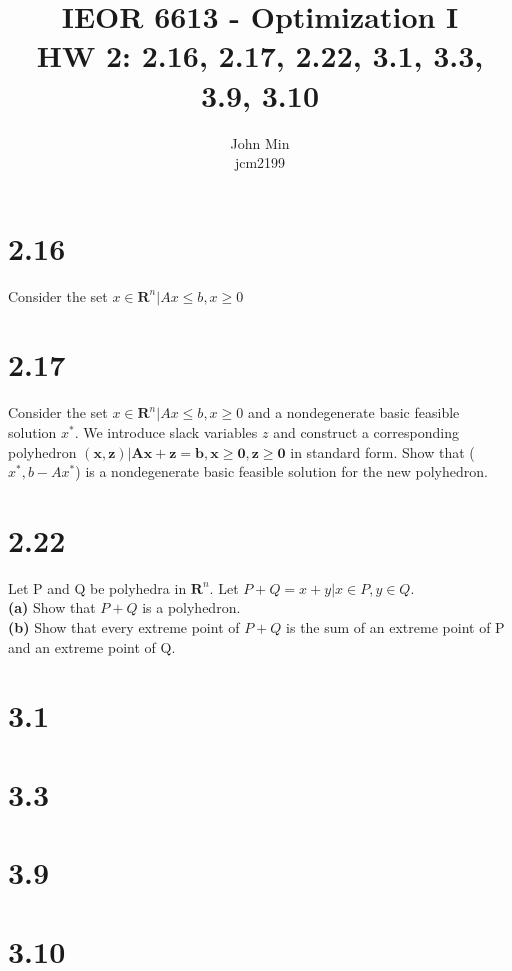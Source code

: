 \documentclass{article}
\begin{document}
\title{IEOR 6613 - Optimization I\\ HW 2:  2.16, 2.17, 2.22, 3.1, 3.3, 3.9, 3.10}

\author{John Min\\ jcm2199}
\maketitle

\section{2.16}
Consider the set {$x \in \mathbf{R}^n | Ax \leq b, x \geq 0$} 

\section{2.17}
Consider the set {$x \in \mathbf{R}^n | Ax \leq b, x \geq 0$} and a nondegenerate basic feasible solution $x^*$.  We introduce slack variables $z$ and construct a corresponding polyhedron {$\mathbf{(x,z) | Ax + z = b, x \geq 0, z \geq 0}$} in standard form.  Show that ($x^*, b-Ax^*$) is a nondegenerate basic feasible solution for the new polyhedron.



\section{2.22}
Let P and Q be polyhedra in $\mathbf{R}^n$.  Let $P + Q = {x + y | x \in P, y \in Q}$.\\

\noindent \textbf{(a)} Show that $P + Q$ is a polyhedron.\\

\noindent \textbf{(b)} Show that every extreme point of $P + Q$ is the sum of an extreme point of P and an extreme point of Q.\\
\section{3.1}
\section{3.3}
\section{3.9}
\section{3.10}
\end{document}
